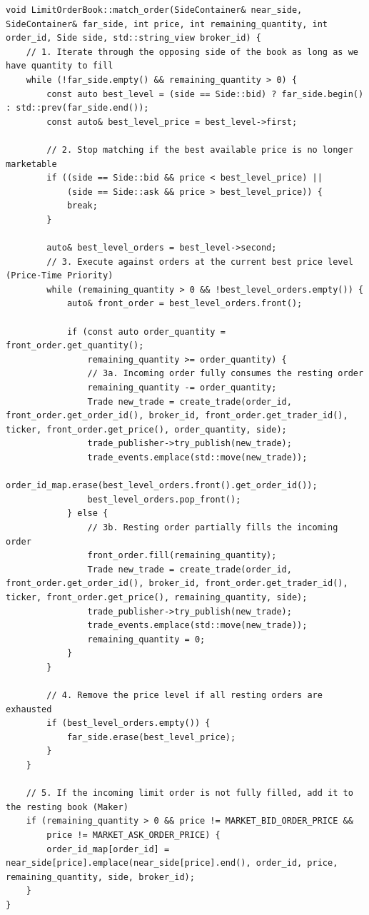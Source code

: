 \documentclass[12pt,a4paper]{article}
\begin{document}
\vspace{1em}
\begin{lstlisting}[caption={Limit Order Book Matching Algorithm}, label={lst:match_order}]
void LimitOrderBook::match_order(SideContainer& near_side, SideContainer& far_side, int price, int remaining_quantity, int order_id, Side side, std::string_view broker_id) {
    // 1. Iterate through the opposing side of the book as long as we have quantity to fill
    while (!far_side.empty() && remaining_quantity > 0) {
        const auto best_level = (side == Side::bid) ? far_side.begin() : std::prev(far_side.end());
        const auto& best_level_price = best_level->first;

        // 2. Stop matching if the best available price is no longer marketable
        if ((side == Side::bid && price < best_level_price) ||
            (side == Side::ask && price > best_level_price)) {
            break;
        }

        auto& best_level_orders = best_level->second;
        // 3. Execute against orders at the current best price level (Price-Time Priority)
        while (remaining_quantity > 0 && !best_level_orders.empty()) {
            auto& front_order = best_level_orders.front();

            if (const auto order_quantity = front_order.get_quantity();
                remaining_quantity >= order_quantity) {
                // 3a. Incoming order fully consumes the resting order
                remaining_quantity -= order_quantity;
                Trade new_trade = create_trade(order_id, front_order.get_order_id(), broker_id, front_order.get_trader_id(), ticker, front_order.get_price(), order_quantity, side);
                trade_publisher->try_publish(new_trade);
                trade_events.emplace(std::move(new_trade));
                order_id_map.erase(best_level_orders.front().get_order_id());
                best_level_orders.pop_front();
            } else {
                // 3b. Resting order partially fills the incoming order
                front_order.fill(remaining_quantity);
                Trade new_trade = create_trade(order_id, front_order.get_order_id(), broker_id, front_order.get_trader_id(), ticker, front_order.get_price(), remaining_quantity, side);
                trade_publisher->try_publish(new_trade);
                trade_events.emplace(std::move(new_trade));
                remaining_quantity = 0;
            }
        }

        // 4. Remove the price level if all resting orders are exhausted
        if (best_level_orders.empty()) {
            far_side.erase(best_level_price);
        }
    }

    // 5. If the incoming limit order is not fully filled, add it to the resting book (Maker)
    if (remaining_quantity > 0 && price != MARKET_BID_ORDER_PRICE &&
        price != MARKET_ASK_ORDER_PRICE) {
        order_id_map[order_id] = near_side[price].emplace(near_side[price].end(), order_id, price, remaining_quantity, side, broker_id);
    }
}
\end{lstlisting}
\end{document}

